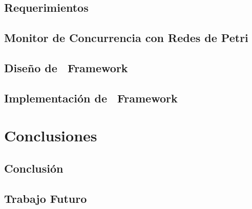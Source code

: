 \documentclass[twoside, openright]{report}
\begin{document}
        \chapter{Requerimientos}
            
        \chapter{Monitor de Concurrencia con Redes de Petri}
        	\label{cap:petri_monitor}
            
            
            

        \chapter{Diseño de \nombreFramework \ Framework}
        	\label{cap:diseno_framework}
        	
            
            
            
            
            
        \chapter{Implementación de \nombreFramework \ Framework}
            

    \part{Conclusiones}
        \chapter{Conclusión}
            
        \chapter{Trabajo Futuro}
            
\end{document}
